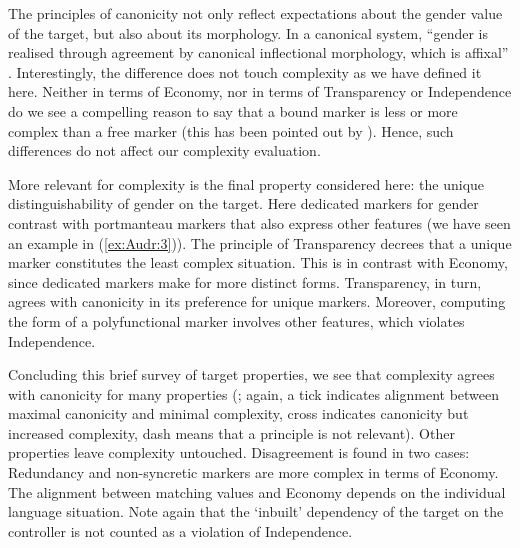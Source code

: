 \documentclass[output=collectionpaper]{langsci/langscibook}
\begin{document}
The principles of canonicity not only reflect expectations about the gender value of the target, but also about its morphology. In a canonical system, ``gender is realised through agreement by canonical inflectional morphology, which is affixal'' \citep[509]{Corbett2016}. Interestingly, the difference does not touch complexity as we have defined it here. Neither in terms of Economy, nor in terms of Transparency or Independence do we see a compelling reason to say that a bound marker is less or more complex than a free marker (this has been pointed out by \citealt{Leufkens2014}). Hence, such differences do not affect our complexity evaluation.

More relevant for complexity is the final property considered here: the unique distinguishability of gender on the target. Here dedicated markers for gender contrast with portmanteau markers that also express other features (we have seen an example in (\ref{ex:Audr:3})). The principle of Transparency decrees that a unique marker constitutes the least complex situation. This is in contrast with Economy, since dedicated markers make for more distinct forms. Transparency, in turn, agrees with canonicity in its preference for unique markers. Moreover, computing the form of a polyfunctional marker involves other features, which violates Independence.

Concluding this brief survey of target properties, we see that complexity agrees with canonicity for many properties (; again, a tick indicates alignment between maximal canonicity and minimal complexity, cross indicates canonicity but increased complexity, dash means that a principle is not relevant). Other properties leave complexity untouched. Disagreement is found in two cases: Redundancy and non-syncretic markers are more complex in terms of Economy. The alignment between matching values and Economy depends on the individual language situation. Note again that the `inbuilt' dependency of the target on the controller is not counted as a violation of Independence.
\end{document}
